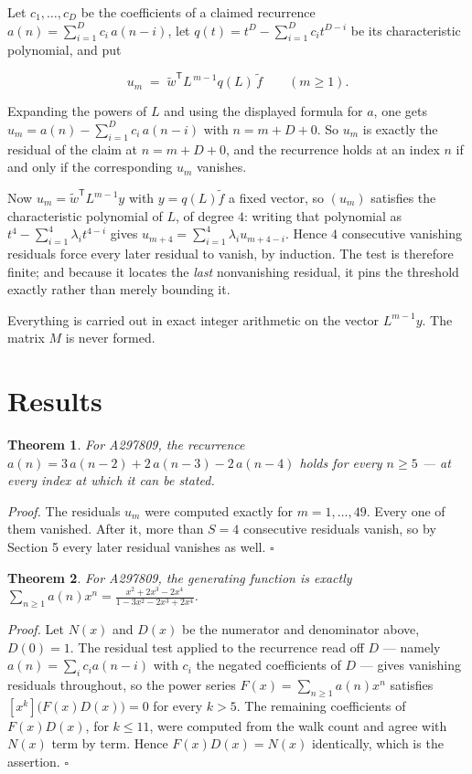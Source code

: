 \documentclass[11pt]{article}
\newtheorem{theorem}{Theorem}
\theoremstyle{definition}
\begin{document}
Let $c_1,\dots,c_D$ be the coefficients of a claimed recurrence $a(n) = \sum_{i=1}^{D} c_i\,a(n-i)$, let $q(t) = t^{D} - \sum_{i=1}^{D} c_i t^{D-i}$ be its characteristic polynomial, and put

\[u_m \;=\; \tilde w^{\mathsf T} L^{\,m-1} q(L)\,\tilde f \qquad (m \ge 1).\]

Expanding the powers of $L$ and using the displayed formula for $a$, one gets $u_m = a(n) - \sum_{i=1}^{D} c_i\,a(n-i)$ with $n = m + D + 0$. So $u_m$ is exactly the residual of the claim at $n = m + D + 0$, and the recurrence holds at an index $n$ if and only if the corresponding $u_m$ vanishes.

Now $u_m = \tilde w^{\mathsf T} L^{m-1} y$ with $y = q(L)\tilde f$ a fixed vector, so $(u_m)$ satisfies the characteristic polynomial of $L$, of degree $4$: writing that polynomial as $t^{4} - \sum_{i=1}^{4} \lambda_i t^{4-i}$ gives $u_{m+4} = \sum_{i=1}^{4} \lambda_i u_{m+4-i}$. Hence $4$ consecutive vanishing residuals force every later residual to vanish, by induction. The test is therefore finite; and because it locates the {\itshape last} nonvanishing residual, it pins the threshold exactly rather than merely bounding it.

Everything is carried out in exact integer arithmetic on the vector $L^{m-1}y$. The matrix $M$ is never formed.

\section{Results}

\begin{theorem} For A297809, the recurrence $a(n) = 3\,a(n-2) + 2\,a(n-3) - 2\,a(n-4)$ holds for every $n \ge 5$ --- at every index at which it can be stated.\end{theorem}

{\itshape Proof.} The residuals $u_m$ were computed exactly for $m = 1,\dots,49$. Every one of them vanished. After it, more than $S = 4$ consecutive residuals vanish, so by Section 5 every later residual vanishes as well. $\square$

\begin{theorem} For A297809, the generating function is exactly $\sum_{n\ge 1} a(n)x^n = \frac{x^{2} + 2x^{3} - 2x^{4}}{1 - 3x^{2} - 2x^{3} + 2x^{4}}$.\end{theorem}

{\itshape Proof.} Let $N(x)$ and $D(x)$ be the numerator and denominator above, $D(0)=1$. The residual test applied to the recurrence read off $D$ --- namely $a(n) = \sum_i c_i a(n-i)$ with $c_i$ the negated coefficients of $D$ --- gives vanishing residuals throughout, so the power series $F(x)=\sum_{n\ge 1}a(n)x^n$ satisfies $[x^k]\bigl(F(x)D(x)\bigr) = 0$ for every $k > 5$. The remaining coefficients of $F(x)D(x)$, for $k \le 11$, were computed from the walk count and agree with $N(x)$ term by term. Hence $F(x)D(x) = N(x)$ identically, which is the assertion. $\square$
\end{document}

